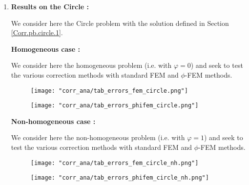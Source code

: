 \begin{enumerate}[label=\textbullet]
	\item \textbf{Results on the Circle :}
	
	We consider here the Circle problem with the solution defined in Section \ref{Corr.pb.circle.1}.
	
	\textbf{Homogeneous case :}
	
	We consider here the homogeneous problem (i.e. with $\varphi=0$) and seek to test the various correction methods with standard FEM and $\phi$-FEM methods.
	
	\begin{minipage}{0.48\linewidth}
		\begin{figure}[H]
			\centering
			\texttt{[image: "corr\_ana/tab\_errors\_fem\_circle.png"]}
			\label{tab_errors_fem_circle}
		\end{figure} 
	\end{minipage}
	\begin{minipage}{0.48\linewidth} \qquad 
		\begin{figure}[H]
			\centering
			\texttt{[image: "corr\_ana/tab\_errors\_phifem\_circle.png"]}
			\label{tab_errors_phifem_circle}
		\end{figure} 
	\end{minipage}
	
	\textbf{Non-homogeneous case :}
	
	We consider here the non-homogeneous problem (i.e. with $\varphi=1$) and seek to test the various correction methods with standard FEM and $\phi$-FEM methods.
	
	\begin{minipage}{0.48\linewidth}
		\begin{figure}[H]
			\centering
			\texttt{[image: "corr\_ana/tab\_errors\_fem\_circle\_nh.png"]}
			\label{tab_errors_fem_circle_nh}
		\end{figure} 
	\end{minipage}
	\begin{minipage}{0.48\linewidth} \qquad 
		\begin{figure}[H]
			\centering
			\texttt{[image: "corr\_ana/tab\_errors\_phifem\_circle\_nh.png"]}
			\label{tab_errors_phifem_circle_nh}
		\end{figure} 
	\end{minipage}
	

\end{enumerate}
